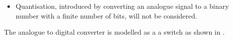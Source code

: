 \begin{slide}\label{slide:l7s2}
  \begin{itemize}
   \item Quantisation, introduced by converting an analogue signal to a
     binary number with a finite number of bits, will not be considered. 
  \end{itemize}
\end{slide}


The analogue to digital converter is modelled as a a switch as
shown in . 

\ifslidesonly
\begin{slide}

\end{slide}
\fi


\ifslidesonly
\begin{slide}

\end{slide}
\fi


\begin{slide}\label{slide:l7s3}
\end{slide}

\ifslidesonly
\begin{slide}

\end{slide}
\fi


